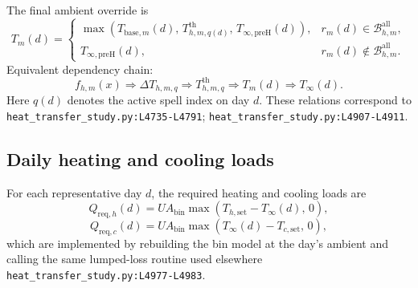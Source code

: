 \documentclass[11pt]{article}
\newcommand{\srcref}[1]{\nolinkurl{#1}}
\begin{document}
The final ambient override is
\begin{equation}
\label{eq:heatwave_override}
T_m(d)=
\begin{cases}
\max\!\left(T_{\mathrm{base},m}(d),\,T_{h,m,q(d)}^{\mathrm{th}},\,T_{\infty,\mathrm{preH}}(d)\right), & r_m(d)\in\mathcal{B}_{h,m}^{\mathrm{all}},\\
T_{\infty,\mathrm{preH}}(d), & r_m(d)\notin\mathcal{B}_{h,m}^{\mathrm{all}}.
\end{cases}
\end{equation}
Equivalent dependency chain:
\begin{equation}
\label{eq:heatwave_chain}
f_{h,m}(x)\Rightarrow \Delta T_{h,m,q}\Rightarrow T_{h,m,q}^{\mathrm{th}}
\Rightarrow T_m(d)\Rightarrow T_\infty(d).
\end{equation}
Here \(q(d)\) denotes the active spell index on day \(d\). These relations correspond to \srcref{heat_transfer_study.py:L4735-L4791}; \srcref{heat_transfer_study.py:L4907-L4911}.

\subsection{Daily heating and cooling loads}
For each representative day \(d\), the required heating and cooling loads are
\begin{equation}
\label{eq:daily_required_heating}
Q_{\mathrm{req},h}(d)=UA_{\mathrm{bin}}\max\!\left(T_{h,\mathrm{set}}-T_\infty(d),\,0\right),
\end{equation}
\begin{equation}
\label{eq:daily_required_cooling}
Q_{\mathrm{req},c}(d)=UA_{\mathrm{bin}}\max\!\left(T_\infty(d)-T_{c,\mathrm{set}},\,0\right),
\end{equation}
which are implemented by rebuilding the bin model at the day's ambient and calling the same lumped-loss routine used elsewhere \srcref{heat_transfer_study.py:L4977-L4983}.
\end{document}
